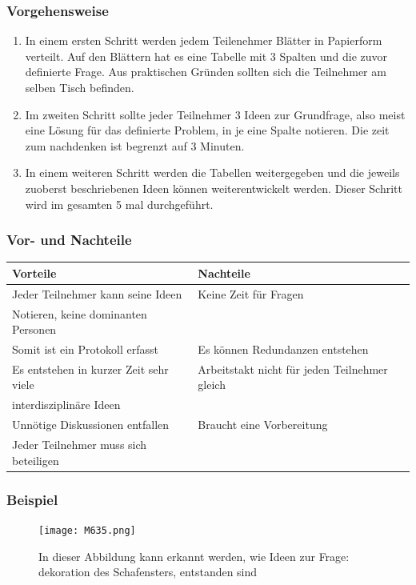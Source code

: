 \subsubsection{Vorgehensweise}
\begin{enumerate}

\item In einem ersten Schritt werden jedem Teilenehmer Blätter in Papierform verteilt. Auf den Blättern hat es eine Tabelle mit 3 Spalten und die zuvor definierte Frage. Aus praktischen Gründen sollten sich die Teilnehmer am selben Tisch befinden.
\item Im zweiten Schritt sollte jeder Teilnehmer 3 Ideen zur Grundfrage, also meist eine Lösung für das definierte Problem, in je eine Spalte notieren. Die zeit zum nachdenken ist begrenzt auf 3 Minuten.
\item In einem weiteren Schritt werden die Tabellen weitergegeben und die jeweils zuoberst beschriebenen Ideen können weiterentwickelt werden. Dieser Schritt wird im gesamten 5 mal durchgeführt.

\end{enumerate}

\subsubsection{Vor- und Nachteile}
\begin{tabular}{|l|l|}
	\hline 
	\textbf{Vorteile} & \textbf{Nachteile} \\ 
	\hline 
	Jeder Teilnehmer kann seine Ideen & Keine Zeit für Fragen  \\
	 Notieren, keine dominanten Personen&\\ 
	\hline 
	Somit ist ein Protokoll erfasst&Es können Redundanzen entstehen \\ 
	\hline 
	Es entstehen in kurzer Zeit sehr viele&Arbeitstakt nicht für jeden Teilnehmer gleich\\
	interdisziplinäre Ideen&  \\ 
	\hline 
	Unnötige Diskussionen entfallen&Braucht eine Vorbereitung \\ 
	\hline 
	Jeder Teilnehmer muss sich beteiligen&  \\ 
	\hline 
\end{tabular} 
\subsubsection{Beispiel}
\begin{figure}[H]
	\centering
	\texttt{[image: M635.png]}
	\caption{In dieser Abbildung kann erkannt werden, wie Ideen zur Frage: dekoration des Schafensters, entstanden sind}
\end{figure}
\newpage
